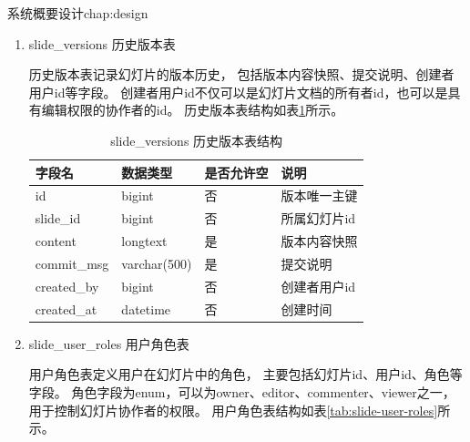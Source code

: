 \begin{cuzchapter}{系统概要设计}{chap:design}
\begin{enumerate}
    \item slide\_versions 历史版本表

    历史版本表记录幻灯片的版本历史，
    包括版本内容快照、提交说明、创建者用户id等字段。
    创建者用户id不仅可以是幻灯片文档的所有者id，也可以是具有编辑权限的协作者的id。
    历史版本表结构如表\ref{tab:slide-versions}所示。

    \begin{table}[htbp]
        \centering
        \caption{slide\_versions 历史版本表结构}
        \label{tab:slide-versions}
        \begin{tabular}{llll}
            \toprule
            字段名         & 数据类型         & 是否允许空 & 说明      \\
            \midrule
            id          & bigint       & 否     & 版本唯一主键  \\
            slide\_id   & bigint       & 否     & 所属幻灯片id \\
            content     & longtext     & 是     & 版本内容快照  \\
            commit\_msg & varchar(500) & 是     & 提交说明    \\
            created\_by & bigint       & 否     & 创建者用户id \\
            created\_at & datetime     & 否     & 创建时间    \\
            \bottomrule
        \end{tabular}
    \end{table}

    \item slide\_user\_roles 用户角色表

    用户角色表定义用户在幻灯片中的角色，
    主要包括幻灯片id、用户id、角色等字段。
    角色字段为enum，可以为owner、editor、commenter、viewer之一，
    用于控制幻灯片协作者的权限。
    用户角色表结构如表\ref{tab:slide-user-roles}所示。


\end{enumerate}
\end{cuzchapter}
